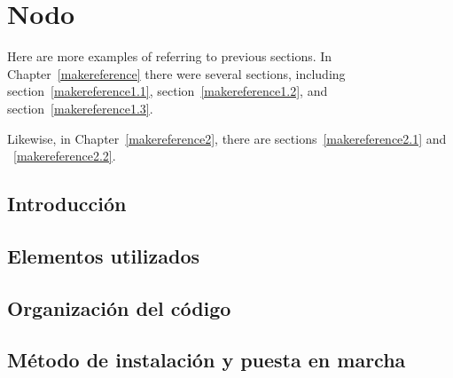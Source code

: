 \cleardoublepage

\chapter{Nodo}
\label{makereference4}

Here are more examples of referring to previous sections.  In
Chapter~\ref{makereference} there were several sections, including
section~\ref{makereference1.1}, section~\ref{makereference1.2},
and section~\ref{makereference1.3}.

Likewise, in Chapter~\ref{makereference2}, there are
sections~\ref{makereference2.1} and ~\ref{makereference2.2}.

\section{Introducción}
\label{makereference4.1}

\section{Elementos utilizados}
\label{makereference4.2}

\section{Organización del código}
\label{makereference4.3}

\section{Método de instalación y puesta en marcha}
\label{makereference3.4}